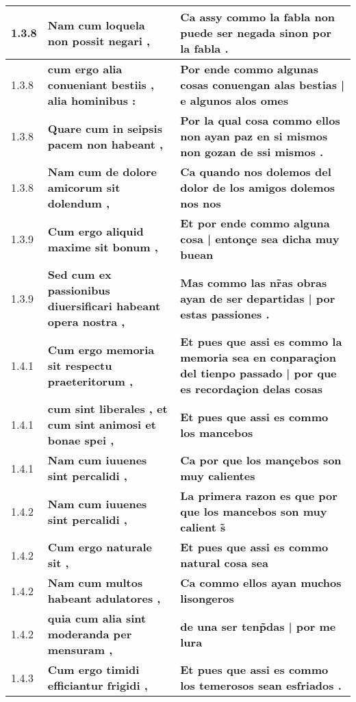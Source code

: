 \begin{tabular}{|p{1cm}|p{6.5cm}|p{6.5cm}|}
1.3.8 &  \textbf{ Nam cum loquela non possit negari , }  &  \textbf{ Ca assy commo la fabla non puede ser negada sinon por la fabla . }  \\\hline
1.3.8 &  \textbf{ cum ergo alia conueniant bestiis , alia hominibus : }  &  \textbf{ Por ende commo algunas cosas conuengan alas bestias | e algunos alos omes }  \\\hline
1.3.8 &  \textbf{ Quare cum in seipsis pacem non habeant , }  &  \textbf{ Por la qual cosa commo ellos non ayan paz en si mismos non gozan de ssi mismos . }  \\\hline
1.3.8 &  \textbf{ Nam cum de dolore amicorum sit dolendum , }  &  \textbf{ Ca quando nos dolemos del dolor de los amigos dolemos nos nos }  \\\hline
1.3.9 &  \textbf{ Cum ergo aliquid maxime sit bonum , }  &  \textbf{ Et por ende commo alguna cosa | entonçe sea dicha muy buean }  \\\hline
1.3.9 &  \textbf{ Sed cum ex passionibus diuersificari habeant opera nostra , }  &  \textbf{ Mas commo las nr̃as obras ayan de ser departidas | por estas passiones . }  \\\hline
1.4.1 &  \textbf{ Cum ergo memoria sit respectu praeteritorum , }  &  \textbf{ Et pues que assi es commo la memoria sea en conparaçion del tienpo passado | por que es recordaçion delas cosas }  \\\hline
1.4.1 &  \textbf{ cum sint liberales , et cum sint animosi et bonae spei , }  &  \textbf{ Et pues que assi es commo los mancebos }  \\\hline
1.4.1 &  \textbf{ Nam cum iuuenes sint percalidi , }  &  \textbf{ Ca por que los mançebos son muy calientes }  \\\hline
1.4.2 &  \textbf{ Nam cum iuuenes sint percalidi , }  &  \textbf{ La primera razon es que por que los mancebos son muy calient s̃ }  \\\hline
1.4.2 &  \textbf{ Cum ergo naturale sit , }  &  \textbf{ Et pues que assi es commo natural cosa sea }  \\\hline
1.4.2 &  \textbf{ Nam cum multos habeant adulatores , }  &  \textbf{ Ca commo ellos ayan muchos lisongeros }  \\\hline
1.4.2 &  \textbf{ quia cum alia sint moderanda per mensuram , }  &  \textbf{ de una ser tenp̃das | por me lura }  \\\hline
1.4.3 &  \textbf{ Cum ergo timidi efficiantur frigidi , }  &  \textbf{ Et pues que assi es commo los temerosos sean esfriados . }  \\\hline

\end{tabular}
